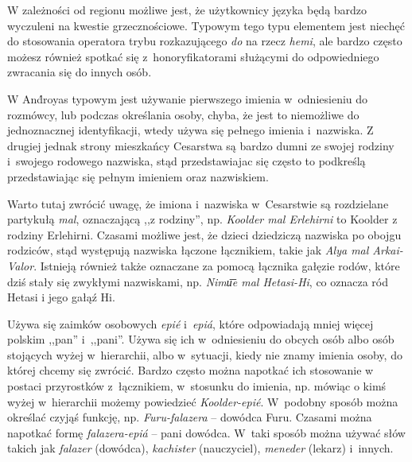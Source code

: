 W zależności od regionu możliwe jest, że użytkownicy języka będą bardzo
wyczuleni na kwestie grzecznościowe. Typowym tego typu elementem jest niechęć do
stosowania operatora trybu rozkazującego \emph{do} na rzecz \emph{hemi}, ale
bardzo często możesz również spotkać się z~honoryfikatorami służącymi do
odpowiedniego zwracania się do innych osób.

W And́royas typowym jest używanie pierwszego imienia w~odniesieniu do rozmówcy,
lub podczas określania osoby, chyba, że jest to niemożliwe do jednoznacznej
identyfikacji, wtedy używa się pełnego imienia i~nazwiska. Z drugiej jednak
strony mieszkańcy Cesarstwa są bardzo dumni ze swojej rodziny i~swojego rodowego
nazwiska, stąd przedstawiajac się często to podkreślą przedstawiając się pełnym
imieniem oraz nazwiskiem.


Warto tutaj zwrócić uwagę, że imiona i~nazwiska w~Cesarstwie są rozdzielane
partykułą \emph{mal}, oznaczającą ,,z rodziny'', np. \emph{Koolder mal
    Erlehirni} to Koolder z rodziny Erlehirni. Czasami możliwe jest, że dzieci
dziedziczą nazwiska po obojgu rodziców, stąd występują nazwiska łączone
łącznikiem, takie jak \emph{Alya mal Arkai-Valor}. Istnieją również także
oznaczane za pomocą łącznika gałęzie rodów, które dziś stały się zwykłymi
nazwiskami, np. \emph{Nimu͞e mal Hetasi-Hi}, co oznacza ród Hetasi i jego gałąź
Hi.

\skipline

Używa się zaimków osobowych \emph{epié} i~\emph{epiá}, które odpowiadają mniej
więcej polskim ,,pan'' i~,,pani''. Używa się ich w~odniesieniu do obcych osób
albo osób stojących wyżej w~hierarchii, albo w~sytuacji, kiedy nie znamy imienia
osoby, do której chcemy się zwrócić. Bardzo często można napotkać ich stosowanie
w postaci przyrostków z~łącznikiem, w~stosunku do imienia, np. mówiąc o kimś
wyżej w~hierarchii możemy powiedzieć \emph{Koolder-epié}. W~podobny sposób
można określać czyjąś funkcję, np. \emph{Furu-falazera} -- dowódca Furu. Czasami
można napotkać formę \emph{falazera-epiá} -- pani dowódca. W~taki sposób można
używać słów takich jak \emph{falazer} (dowódca), \emph{kachister} (nauczyciel),
\emph{meneder} (lekarz) i~innych.

